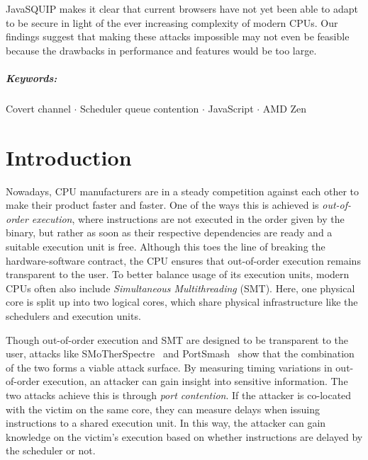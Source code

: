 \documentclass[11pt,
  titlepage=false,
]{scrreprt}
\begin{document}
JavaSQUIP makes it clear that current browsers have not yet been able to adapt to be secure in light of the ever increasing complexity of modern CPUs.
Our findings suggest that making these attacks impossible may not even be feasible because the drawbacks in performance and features would be too large.
\paragraph{Keywords:}
Covert channel $\cdot$
Scheduler queue contention $\cdot$
JavaScript $\cdot$
AMD Zen

\clearpage


\chapter{Introduction}
\label{ch:introduction}

Nowadays, CPU manufacturers are in a steady competition against each other to make their product faster and faster.
One of the ways this is achieved is \textit{out-of-order execution}, where instructions are not executed in the order given by the binary,
but rather as soon as their respective dependencies are ready and a suitable execution unit is free.
Although this toes the line of breaking the hardware-software contract, the CPU ensures that out-of-order execution remains transparent to the user.
To better balance usage of its execution units, modern CPUs often also include \textit{Simultaneous Multithreading} (SMT).
Here, one physical core is split up into two logical cores, which share physical infrastructure like the schedulers and execution units.

Though out-of-order execution and SMT are designed to be transparent to the user, attacks like
SMoTherSpectre~\cite{Bhattacharyya2019} and PortSmash~\cite{Aldaya2019port} show that the combination of the two forms a viable attack surface.
By measuring timing variations in out-of-order execution, an attacker can gain insight into sensitive information.
The two attacks achieve this is through \textit{port contention}.
If the attacker is co-located with the victim on the same core, they can measure delays when issuing instructions to a shared execution unit.
In this way, the attacker can gain knowledge on the victim's execution based on whether instructions are delayed by the scheduler or not.
\end{document}
